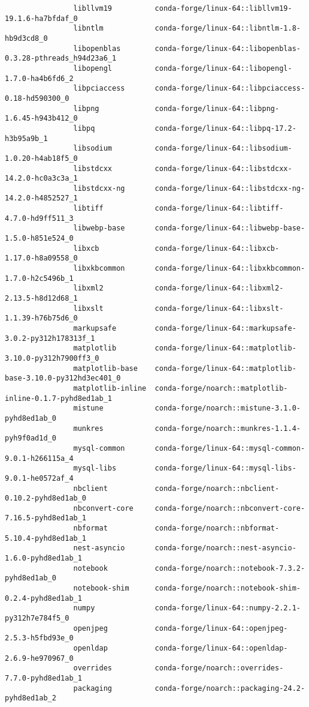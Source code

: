 \documentclass{article}
\begin{document}
\begin{itemize}
\begin{itemize}
\begin{itemize}
\begin{verbatim}
				libllvm19          conda-forge/linux-64::libllvm19-19.1.6-ha7bfdaf_0 
				libntlm            conda-forge/linux-64::libntlm-1.8-hb9d3cd8_0 
				libopenblas        conda-forge/linux-64::libopenblas-0.3.28-pthreads_h94d23a6_1 
				libopengl          conda-forge/linux-64::libopengl-1.7.0-ha4b6fd6_2 
				libpciaccess       conda-forge/linux-64::libpciaccess-0.18-hd590300_0 
				libpng             conda-forge/linux-64::libpng-1.6.45-h943b412_0 
				libpq              conda-forge/linux-64::libpq-17.2-h3b95a9b_1 
				libsodium          conda-forge/linux-64::libsodium-1.0.20-h4ab18f5_0 
				libstdcxx          conda-forge/linux-64::libstdcxx-14.2.0-hc0a3c3a_1 
				libstdcxx-ng       conda-forge/linux-64::libstdcxx-ng-14.2.0-h4852527_1 
				libtiff            conda-forge/linux-64::libtiff-4.7.0-hd9ff511_3 
				libwebp-base       conda-forge/linux-64::libwebp-base-1.5.0-h851e524_0 
				libxcb             conda-forge/linux-64::libxcb-1.17.0-h8a09558_0 
				libxkbcommon       conda-forge/linux-64::libxkbcommon-1.7.0-h2c5496b_1 
				libxml2            conda-forge/linux-64::libxml2-2.13.5-h8d12d68_1 
				libxslt            conda-forge/linux-64::libxslt-1.1.39-h76b75d6_0 
				markupsafe         conda-forge/linux-64::markupsafe-3.0.2-py312h178313f_1 
				matplotlib         conda-forge/linux-64::matplotlib-3.10.0-py312h7900ff3_0 
				matplotlib-base    conda-forge/linux-64::matplotlib-base-3.10.0-py312hd3ec401_0 
				matplotlib-inline  conda-forge/noarch::matplotlib-inline-0.1.7-pyhd8ed1ab_1 
				mistune            conda-forge/noarch::mistune-3.1.0-pyhd8ed1ab_0 
				munkres            conda-forge/noarch::munkres-1.1.4-pyh9f0ad1d_0 
				mysql-common       conda-forge/linux-64::mysql-common-9.0.1-h266115a_4 
				mysql-libs         conda-forge/linux-64::mysql-libs-9.0.1-he0572af_4 
				nbclient           conda-forge/noarch::nbclient-0.10.2-pyhd8ed1ab_0 
				nbconvert-core     conda-forge/noarch::nbconvert-core-7.16.5-pyhd8ed1ab_1 
				nbformat           conda-forge/noarch::nbformat-5.10.4-pyhd8ed1ab_1 
				nest-asyncio       conda-forge/noarch::nest-asyncio-1.6.0-pyhd8ed1ab_1 
				notebook           conda-forge/noarch::notebook-7.3.2-pyhd8ed1ab_0 
				notebook-shim      conda-forge/noarch::notebook-shim-0.2.4-pyhd8ed1ab_1 
				numpy              conda-forge/linux-64::numpy-2.2.1-py312h7e784f5_0 
				openjpeg           conda-forge/linux-64::openjpeg-2.5.3-h5fbd93e_0 
				openldap           conda-forge/linux-64::openldap-2.6.9-he970967_0 
				overrides          conda-forge/noarch::overrides-7.7.0-pyhd8ed1ab_1 
				packaging          conda-forge/noarch::packaging-24.2-pyhd8ed1ab_2 

\end{verbatim}
\end{itemize}
\end{itemize}
\end{itemize}
\end{document}
